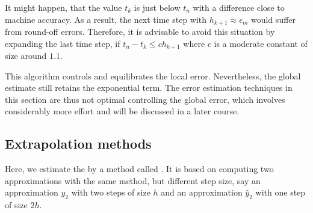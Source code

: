 \begin{remark}
  It might happen, that the value $t_k$ is just below $t_n$ with a
  difference close to machine accuracy. As a result, the next time step
  with $h_{k+1} \approx \epsilon_m$ would suffer from round-off
  errors. Therefore, it is advisable to avoid this situation by
  expanding the last time step, if $t_n-t_k \le c h_{k+1}$ where $c$
  is a moderate constant of size around $1.1$.
\end{remark}

\begin{remark}
  This algorithm controls and equilibrates the local
  error. Nevertheless, the global estimate still retains the
  exponential term. The error estimation techniques in this section
  are thus not optimal controlling the global error, which involves
  considerably more effort and will be discussed in a later course.
\end{remark}
\subsection{Extrapolation methods}

\begin{intro}
  Here, we estimate the  by a method called
  . It is based on computing two
  approximations with the same method, but different step size, say
  an approximation $y_2$ with two steps of size $h$ and an
  approximation $\hat y_2$ with one step of size $2h$.
\end{intro}



